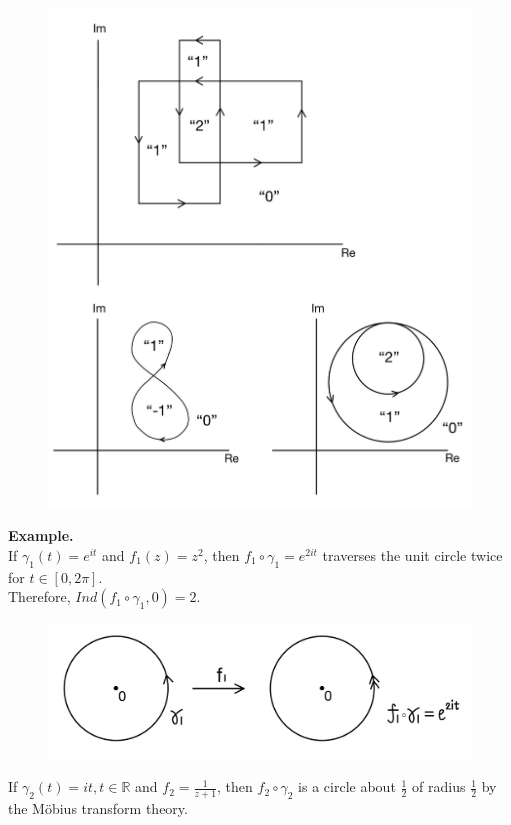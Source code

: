 \documentclass[11pt]{article}
\begin{document}
\begin{figure}[H]
\includegraphics[scale=0.23]{22_23} 
\centering
\end{figure}
\textbf{Example.} \\
If $\gamma_1(t) = e^{it}$ and $f_1(z) = z^2$, then $ f_1 \circ \gamma_1 = e^{2it}$ traverses the unit circle twice for $t \in [0, 2\pi]$. \\
Therefore, $Ind( f_1 \circ \gamma_1, 0) = 2$. 
\begin{figure}[H]
\includegraphics[scale = 0.18]{22_5}
\centering
\end{figure}
If $\gamma_2(t) = it, t \in \mathbb{R}$ and $f_2 = \frac{1}{z + 1}$, then $f_2 \circ \gamma_2$ is a circle about $\frac{1}{2}$ of radius $\frac{1}{2}$ by the Möbius transform theory. \\
\end{document}
